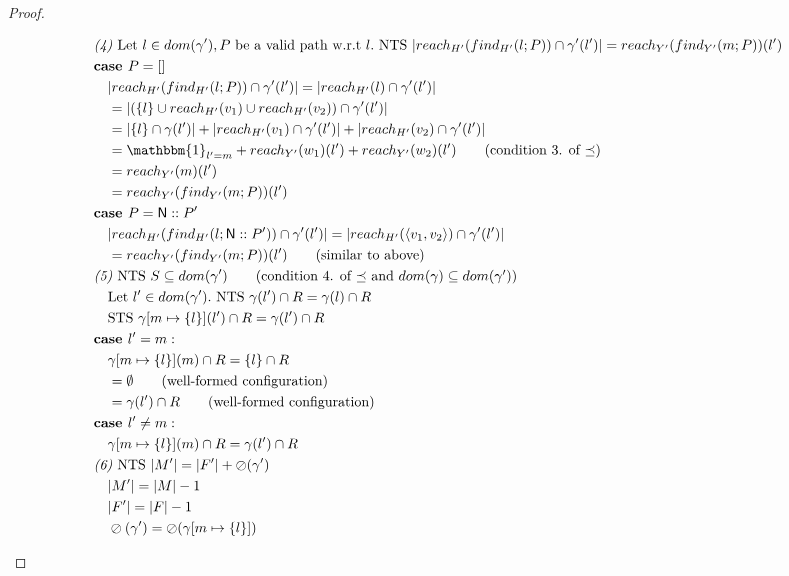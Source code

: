 \documentclass{easychair}
\newcommand{\ms}[1]{\ensuremath{\mathsf{#1}}}
\newcommand{\oh}[1]{\oslash(#1)}
\theoremstyle{definition}
\begin{document}
\begin{proof}
\begin{description}
\begin{align*}
		&\emph{(4) } \text{Let } l \in dom(\gamma'), P \text{ be a valid path w.r.t } l. \text{ NTS }
		|reach_{H'}(find_{H'}(l;P)) \cap \gamma'(l')| = 
				reach_{Y'}(find_{Y'}(m;P))(l')\\
		&\textbf{case } P = []\\
		&\quad |reach_{H'}(find_{H'}(l;P)) \cap \gamma'(l')| = |reach_{H'}(l) \cap \gamma'(l')|\\
		&\quad = |(\{l\} \cup reach_{H'}(v_1) \cup reach_{H'}(v_2)) \cap \gamma'(l')|\\
		&\quad = |\{l\} \cap \gamma(l')| + |reach_{H'}(v_1) \cap \gamma'(l')| 
		+ |reach_{H'}(v_2) \cap \gamma'(l')| \\
		&\quad = \mathbbm{1}_{l' = m} + reach_{Y'}(w_1)(l') + reach_{Y'}(w_2)(l') 
			\tag{condition 3. of $\preceq$}\\
		&\quad = reach_{Y'}(m)(l')\\
		&\quad = reach_{Y'}(find_{Y'}(m;P))(l')\\
		&\textbf{case } P = \ms{N}::P'\\
		&\quad |reach_{H'}(find_{H'}(l;\ms{N}::P')) \cap \gamma'(l')| = 
			|reach_{H'}(\pairexcst{v_1}{v_2}) \cap \gamma'(l')|\\
		&\quad = reach_{Y'}(find_{Y'}(m;P))(l') \tag{similar to above}\\
		&\emph{(5) } \text{NTS } S \subseteq dom(\gamma') 
			\tag{condition 4. of $\preceq$ and $dom(\gamma) \subseteq dom(\gamma')$}\\
		&\quad\text{Let } l' \in dom(\gamma'). \text{ NTS } 
			\gamma(l') \cap R = \gamma(l) \cap R\\
		&\quad \text{STS } \gamma[m \mapsto \{l\}](l') \cap R = \gamma(l') \cap R\\
		&\textbf{case } l' = m:\\
		&\quad \gamma[m \mapsto \{l\}](m) \cap R = \{l\} \cap R\\
		&\quad = \emptyset \tag{well-formed configuration}\\
		&\quad = \gamma(l') \cap R \tag{well-formed configuration}\\
		&\textbf{case } l' \ne m:\\
		&\quad \gamma[m \mapsto \{l\}](m) \cap R = \gamma(l') \cap R\\
		&\emph{(6) } \text{NTS } |M'| = |F'| + \oh{\gamma'}\\
		&\quad |M'| = |M| - 1\\
		&\quad |F'| = |F| - 1\\
		&\quad \oh{\gamma'} = \oh{\gamma[m \mapsto \{l\}]}\\

\end{align*}
\end{description}
\end{proof}
\end{document}
